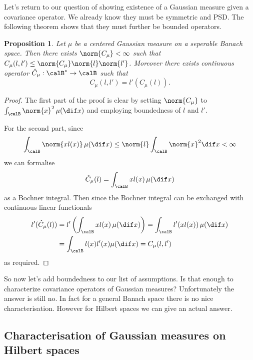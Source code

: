 \documentclass[fontsize=12pt, DIV=10]{scrreprt}
\theoremstyle{mydefn}
\newtheorem{prop}{Proposition}
\theoremstyle{remark}
\begin{document}
Let's return to our question of showing existence of a Gaussian measure given a covariance operator. We already know they must be symmetric and PSD. The following theorem shows that they must further be bounded operators.
\begin{prop}
	\label{prop:bounded-cov}
	Let $\mu$ be a centered Gaussian measure on a seperable Banach space. Then there exists $\norm{C_{\mu}} < \infty$ such that $C_{\mu}(l, l') \leq \norm{C_{\mu}} \norm{l} \norm{l'}$. Moreover there exists continuous operator $\hat{C}_{\mu}: \calB^* \to \calB$ such that
	\begin{equation}
		C_{\mu}(l, l') = l'\left(C_{\mu}(l) \right).
	\end{equation}
\end{prop}
\begin{proof}
	The first part of the proof is clear by setting $\norm{C_{\mu}}$ to $\int_{\calB} \norm{x}^2 \, \mu(\dif x)$ and employing boundedness of $l$ and $l'$.

	For the second part, since
	\begin{equation}
		\int_{\calB} \norm{x l(x)} \, \mu(\dif x) \leq \norm{l} \int_{\calB} \norm{x}^2 \dif x < \infty
	\end{equation}
	we can formalise
	\begin{equation}
		\hat{C}_{\mu}(l) = \int_{\calB} x l(x) \, \mu(\dif x)
	\end{equation}
	as a Bochner integral. Then since the Bochner integral can be exchanged with continuous linear functionals
	\begin{align}
		l'(\hat{C}_{\mu}(l))
		&= l' \left( \int_{\calB} x l(x) \, \mu(\dif x)\right)
		= \int_{\calB} l'(x l(x)) \, \mu(\dif x) \nonumber \\
		&= \int_{\calB} l(x) l'(x) \mu(\dif x)
		= C_{\mu}(l, l')
	\end{align}
	as required.
\end{proof}
So now let's add boundedness to our list of assumptions. Is that enough to characterize covariance operators of Gaussian measures? Unfortunately the answer is still no. In fact for a general Banach space there is no nice characterisation. However for Hilbert spaces we can give an actual answer.

\subsection{Characterisation of Gaussian measures on Hilbert spaces}
\end{document}
